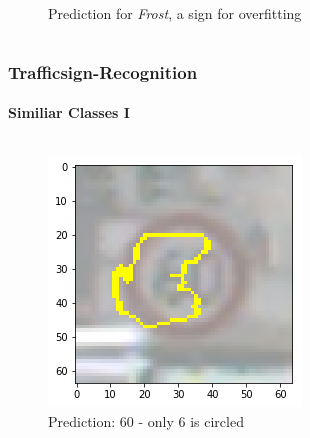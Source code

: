 \begin{frame}
\begin{columns}
\begin{column}{0.33\textwidth}
\begin{center}
\begin{figure}
					\caption[Prediction:  Frost]{ Prediction for \textit{Frost}, a sign for overfitting}
					\label{fig:frostOverfit}
				\end{figure}
			\end{center}
		\end{column}
	\end{columns}
\end{frame}

\begin{frame}
	\frametitle{Trafficsign-Recognition}
	\framesubtitle{Similiar Classes I}
	\begin{columns}
		\begin{column}{0.33\textwidth}
			\begin{center}
				\begin{figure}
					\includegraphics[width=0.9\linewidth]{Images/60Prediction}
					\caption[60]{Prediction: 60 - only 6 is circled}
					\label{fig:60Pred}
				\end{figure}
			\end{center}		
		\end{column}
		\begin{column}{0.33\textwidth}
			\begin{center}
				\begin{figure}

\end{figure}
\end{center}
\end{column}
\end{columns}
\end{frame}
